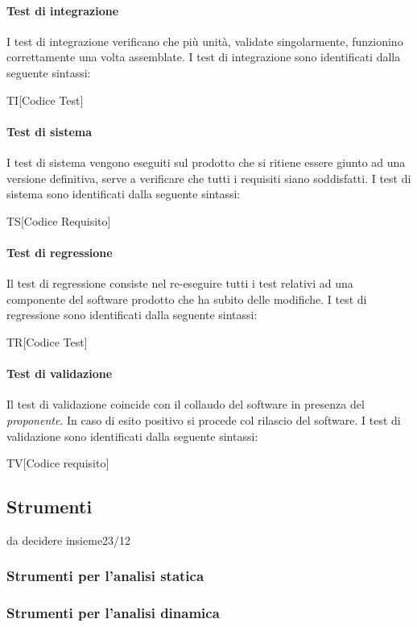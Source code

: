 \paragraph{Test di integrazione}
I test di integrazione verificano che più unità, validate singolarmente, funzionino 
correttamente una volta assemblate. I test di integrazione sono identificati 
dalla seguente sintassi:
\begin{center}
  TI[Codice Test]
\end{center}
\paragraph{Test di sistema}
I test di sistema vengono eseguiti sul prodotto che si ritiene essere giunto ad 
una versione definitiva, serve a verificare che tutti i requisiti siano 
soddisfatti. I test di sistema sono identificati dalla seguente sintassi:
\begin{center}
  TS[Codice Requisito]
\end{center}
\paragraph{Test di regressione}
Il test di regressione consiste nel re-eseguire tutti i test relativi ad una 
componente del software prodotto che ha subito delle modifiche. I test di 
regressione sono identificati dalla seguente sintassi:
\begin{center}
  TR[Codice Test]
\end{center}
\paragraph{Test di validazione}
Il test di validazione coincide con il collaudo del software in presenza del 
\textit{proponente}. In caso di esito positivo si procede col rilascio del 
software. I test di validazione sono identificati dalla seguente sintassi:
\begin{center}
  TV[Codice requisito]
\end{center}

\subsection{Strumenti}
da decidere insieme23/12
\subsubsection{Strumenti per l'analisi statica}

\subsubsection{Strumenti per l'analisi dinamica}



